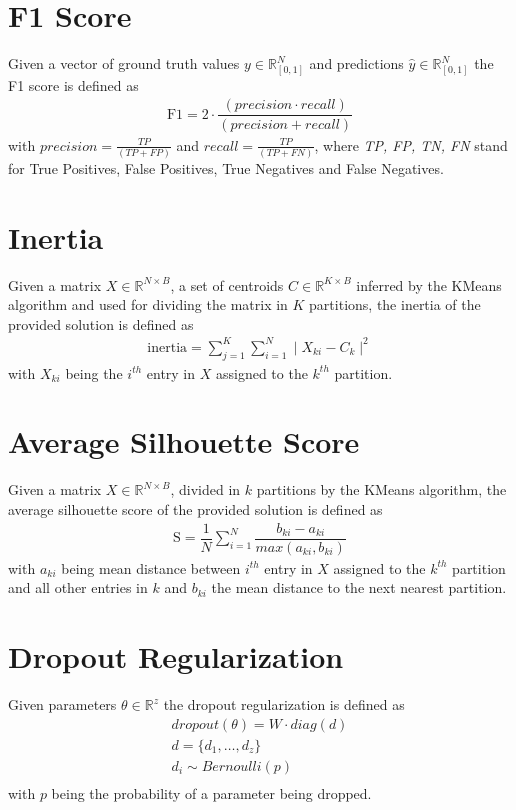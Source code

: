 \section{F1 Score}
Given a vector of ground truth values $y \in \mathbb{R}^N_{[0, 1]}$ and predictions $\widehat{y} \in \mathbb{R}^N_{[0, 1]}$ the F1 score is defined as 
\begin{gather}
\label{F1}
    \text{F1}=
        2 \cdot 
        \dfrac
            {(precision \cdot recall)}
            {(precision + recall)}
\end{gather}
with $precision =\frac {TP}{(TP + FP)}$ and $recall = \frac {TP}{(TP + FN)}$, where \textit{TP, FP, TN, FN} stand for True Positives, False Positives, True Negatives and False Negatives. 

\section{Inertia}
Given a matrix $X \in \mathbb{R}^{N \times B}$, a set of centroids $C \in \mathbb{R}^{K \times B}$ inferred by the KMeans algorithm and used for dividing the matrix in $K$ partitions, the inertia of the provided solution is defined as 
\begin{gather}
\label{inertia}
    \text{inertia}=
        \sum\limits_{j=1}^{K}
        \sum\limits_{i=1}^{N}
        \mid X_{ki} - C_k \mid ^ 2
\end{gather}
with $X_{ki}$ being the $i^{th}$ entry in $X$ assigned to the $k^{th}$ partition.

\section{Average Silhouette Score}
Given a matrix $X \in \mathbb{R}^{N \times B}$, divided in $k$ partitions by the KMeans algorithm, the average silhouette score of the provided solution is defined as 
\begin{gather}
\label{silhouette}
    \text{S}=
        \dfrac{1}{N}\sum\limits_{i=1}^{N}
        \dfrac{b_{ki} - a_{ki}}{max(a_{ki}, b_{ki})}
\end{gather}
with $a_{ki}$ being mean distance between $i^{th}$ entry in $X$ assigned to the $k^{th}$ partition and all other entries in $k$ and $b_{ki}$ the mean distance to the next nearest partition.

\section{Dropout Regularization}
Given parameters $\theta \in \mathbb{R}^z$ the dropout regularization is defined as 
\begin{gather}
    \label{dropout}
    dropout(\theta) = W \cdot diag(d)\\ \nonumber
    d = \{d_1, \dots, d_z\} \\ \nonumber
    d_i \sim Bernoulli(p) \\ \nonumber
\end{gather}
with $p$ being the probability of a parameter being dropped. 

